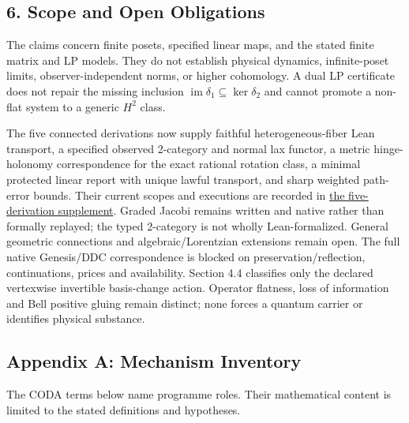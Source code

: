 \documentclass[
  english,
  10pt,
  a4paper,
]{article}
\begin{document}
\subsection{6. Scope and Open
Obligations}\label{scope-and-open-obligations}

The claims concern finite posets, specified linear maps, and the stated
finite matrix and LP models. They do not establish physical dynamics,
infinite-poset limits, observer-independent norms, or higher cohomology.
A dual LP certificate does not repair the missing inclusion
\(\operatorname{im}\delta_1\subseteq\ker\delta_2\) and cannot promote a
non-flat system to a generic \(H^2\) class.

The five connected derivations now supply faithful heterogeneous-fiber
Lean transport, a specified observed 2-category and normal lax functor,
a metric hinge-holonomy correspondence for the exact rational rotation
class, a minimal protected linear report with unique lawful transport,
and sharp weighted path-error bounds. Their current scopes and
executions are recorded in
\href{docs/five_connected_derivations_2026_10_14.md}{the five-derivation
supplement}. Graded Jacobi remains written and native rather than
formally replayed; the typed 2-category is not wholly Lean-formalized.
General geometric connections and algebraic/Lorentzian extensions remain
open. The full native Genesis/DDC correspondence is blocked on
preservation/reflection, continuations, prices and availability. Section
4.4 classifies only the declared vertexwise invertible basis-change
action. Operator flatness, loss of information and Bell positive gluing
remain distinct; none forces a quantum carrier or identifies physical
substance.

\subsection{Appendix A: Mechanism
Inventory}\label{appendix-a-mechanism-inventory}

The CODA terms below name programme roles. Their mathematical content is
limited to the stated definitions and hypotheses.
\end{document}
